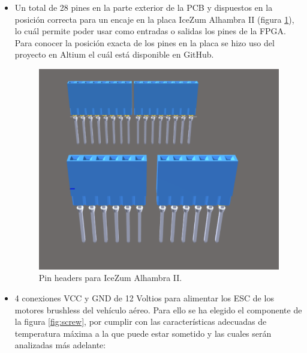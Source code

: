 \begin{itemize}
	\item Un total de 28 pines en la parte exterior de la PCB y dispuestos en la posición correcta para un encaje en la placa IceZum Alhambra II (figura \ref{fig:pin_headers}), lo cuál permite poder usar como entradas o salidas los pines de la FPGA. Para conocer la posición exacta de los pines en la placa se hizo uso del proyecto en Altium el cuál está disponible en GitHub.
	
	\begin{figure}[H]
	\center
	\includegraphics[scale=0.5]{imagenes/Balancing_robot/pin_headers.PNG}
	\caption{Pin headers para IceZum Alhambra II.}
	\label{fig:pin_headers}
	\end{figure}

	
	\item 4 conexiones VCC y GND de 12 Voltios para alimentar los ESC de los motores brushless del vehículo aéreo. Para ello se ha elegido el componente de la figura \ref{fig:screw}, por cumplir con las características adecuadas de temperatura máxima a la que puede estar sometido y las cuales serán analizadas más adelante: 
	

\end{itemize}
